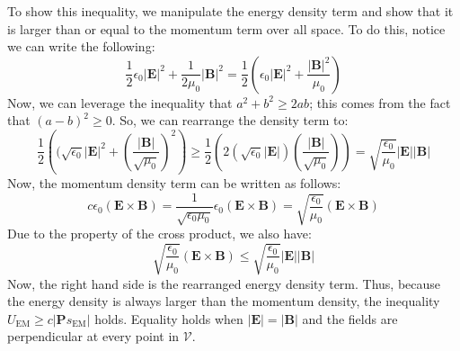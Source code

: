\documentclass[10pt]{article}
\begin{document}
	\begin{solution}
		To show this inequality, we manipulate the energy density term and show that it is larger than or
		equal to the momentum term over all space. To do this, notice we can write the following:
		\[
			\frac{1}{2}\epsilon_0 |\mathbf{E}|^2 + \frac{1}{2\mu_0}|\mathbf{B}|^2 = \frac{1}{2}\left(
			\epsilon_0 |\mathbf{E}|^2 + \frac{|\mathbf{B}|^2}{\mu_0} \right)
		\]
		Now, we can leverage the inequality that \( a^2 + b^2 \geq 2ab \); this comes from the fact that \(
		(a - b)^2 \geq 0 \). So, we can rearrange the density term to:
		\[
			\frac{1}{2}\left( (\sqrt{\epsilon_0}|\mathbf{E}|^2 + \left( \frac{|\mathbf{B}|}{\sqrt{\mu_0}}
			\right)^2 \right) \geq \frac{1}{2} \left( 2 (\sqrt{\epsilon_0}|\mathbf{E}|) \left(
			\frac{|\mathbf{B}|}{\sqrt{\mu_0}} \right) \right) = \sqrt{\frac{\epsilon_0}{\mu_0}}
			|\mathbf{E}||\mathbf{B}|
		\]
		Now, the momentum density term can be written as follows:
		\[
			c \epsilon_0 (\mathbf{E} \times \mathbf{B}) = \frac{1}{\sqrt{\epsilon_0 \mu_0}}\epsilon_0(\mathbf{E}
			\times \mathbf{B}) = \sqrt{\frac{\epsilon_0}{\mu_0}}(\mathbf{E} \times \mathbf{B})
		\]
		Due to the property of the cross product, we also have:
		\[
			\sqrt{\frac{\epsilon_0}{\mu_0}}(\mathbf{E}\times \mathbf{B}) \leq \sqrt{\frac{\epsilon_0}{\mu_0}}
			|\mathbf{E}||\mathbf{B}|
		\]
		Now, the right hand side is the rearranged energy density term. Thus, because the energy density is
		always larger than the momentum density, the inequality \( U_\text{EM} \geq c|\mathbf{P}s_\text{EM}|
		\) holds. Equality holds when \( |\mathbf{E}| = |\mathbf{B}| \) and the fields are perpendicular at
		every point in \( \mathcal{V} \). 
	\end{solution}
\end{document}
